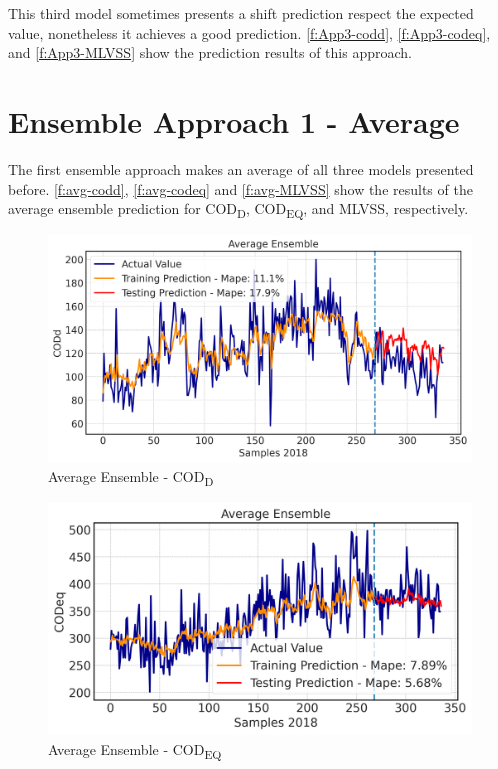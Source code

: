 This third model sometimes presents a shift prediction respect the expected value, nonetheless it achieves a good prediction. \autoref{f:App3-codd}, \autoref{f:App3-codeq}, and \autoref{f:App3-MLVSS} show the prediction results of this approach. 
\clearpage

\section{Ensemble Approach 1 - Average}
The first ensemble approach makes an average of all three models presented before. \autoref{f:avg-codd}, \autoref{f:avg-codeq} and \autoref{f:avg-MLVSS} show the results of the average ensemble prediction for COD\textsubscript{D}, COD\textsubscript{EQ}, and MLVSS, respectively. 

\begin{figure}[h]
\centering
\includegraphics[width=\linewidth]{figures/Ch5/CODd-avg.png}
\caption{Average Ensemble - COD\textsubscript{D}}
\label{f:avg-codd}
\end{figure}

\begin{figure}[h]
\centering
\includegraphics[width=\linewidth]{figures/Ch5/CODeq-avg.png}
\caption{Average Ensemble - COD\textsubscript{EQ}}
\label{f:avg-codeq}
\end{figure}

